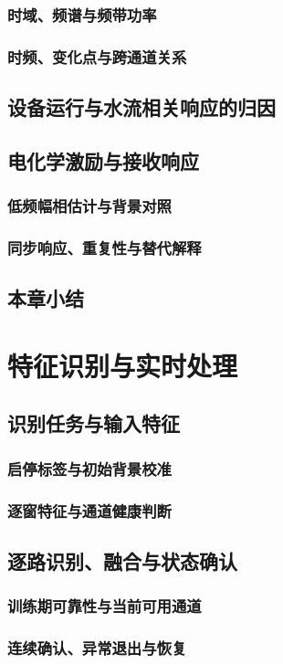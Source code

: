 \subsection{时域、频谱与频带功率}
\subsection{时频、变化点与跨通道关系}
\section{设备运行与水流相关响应的归因}
\section{电化学激励与接收响应}
\subsection{低频幅相估计与背景对照}
\subsection{同步响应、重复性与替代解释}
\section{本章小结}

\chapter{特征识别与实时处理}
\section{识别任务与输入特征}
\subsection{启停标签与初始背景校准}
\subsection{逐窗特征与通道健康判断}
\section{逐路识别、融合与状态确认}
\subsection{训练期可靠性与当前可用通道}
\subsection{连续确认、异常退出与恢复}
